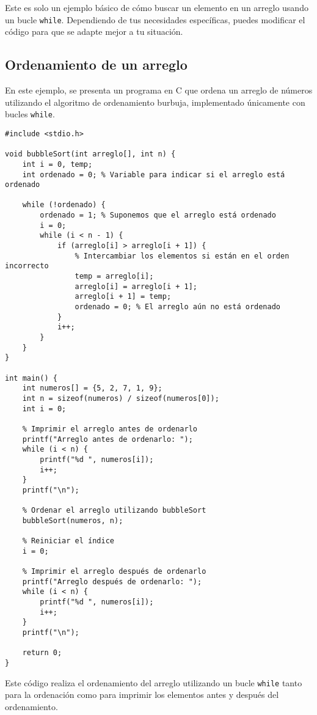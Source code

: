 \documentclass{article}
\begin{document}
Este es solo un ejemplo básico de cómo buscar un elemento en un arreglo usando un bucle \texttt{while}. Dependiendo de tus necesidades específicas, puedes modificar el código para que se adapte mejor a tu situación.

\subsection{Ordenamiento de un arreglo}
En este ejemplo, se presenta un programa en C que ordena un arreglo de números utilizando el algoritmo de ordenamiento burbuja, implementado únicamente con bucles \texttt{while}.

\newpage
\begin{verbatim}
#include <stdio.h>

void bubbleSort(int arreglo[], int n) {
    int i = 0, temp;
    int ordenado = 0; % Variable para indicar si el arreglo está ordenado
    
    while (!ordenado) {
        ordenado = 1; % Suponemos que el arreglo está ordenado
        i = 0;
        while (i < n - 1) {
            if (arreglo[i] > arreglo[i + 1]) {
                % Intercambiar los elementos si están en el orden incorrecto
                temp = arreglo[i];
                arreglo[i] = arreglo[i + 1];
                arreglo[i + 1] = temp;
                ordenado = 0; % El arreglo aún no está ordenado
            }
            i++;
        }
    }
}

int main() {
    int numeros[] = {5, 2, 7, 1, 9};
    int n = sizeof(numeros) / sizeof(numeros[0]);
    int i = 0;

    % Imprimir el arreglo antes de ordenarlo
    printf("Arreglo antes de ordenarlo: ");
    while (i < n) {
        printf("%d ", numeros[i]);
        i++;
    }
    printf("\n");

    % Ordenar el arreglo utilizando bubbleSort
    bubbleSort(numeros, n);

    % Reiniciar el índice
    i = 0;

    % Imprimir el arreglo después de ordenarlo
    printf("Arreglo después de ordenarlo: ");
    while (i < n) {
        printf("%d ", numeros[i]);
        i++;
    }
    printf("\n");

    return 0;
}
\end{verbatim}

Este código realiza el ordenamiento del arreglo utilizando un bucle \texttt{while} tanto para la ordenación como para imprimir los elementos antes y después del ordenamiento.
\end{document}
